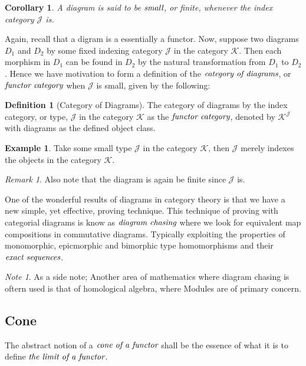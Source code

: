 \documentclass[10pt, oneside, reqno]{amsart}
\theoremstyle{plain}%
\newtheorem*{cor}{Corollary}
\theoremstyle{definition}
\newtheorem{defn}[thm]{Definition}
\newtheorem{exmp}[thm]{Example}
\theoremstyle{remark}
\newtheorem*{rem}{Remark}
\newtheorem*{note}{Note}
\begin{document}
\begin{cor}
 A diagram is said to be $\emph{small}$, or finite, whenever the index category $\mathcal{J}$ is.
\end{cor}

Again, recall that a digram is a essentially a functor.
Now, suppose two diagrams $D_{1}$ and $D_{2}$ by some fixed indexing category $\mathcal{J}$ in the category $\mathcal{K}$.
Then each morphism in $D_{1}$ can be found in $D_{2}$ by the natural transformation from $D_{1}$ to $D_{2}$.
Hence we have motivation to form a definition of the $\emph{category of diagrams}$, or $\emph{functor category}$ when
$\mathcal{J}$ is small, given by the following:

\begin{defn}[Category of Diagrams]
 The category of diagrams by the index category, or type, $\mathcal{J}$ in the category $\mathcal{K}$ as the $\emph{functor category}$,
 denoted by $\mathcal{K}^{\mathcal{J}}$ with diagrams as the defined object class.
\end{defn}

\begin{exmp}
 Take some small type $\mathcal{J}$ in the category $\mathcal{K}$,
 then $\mathcal{J}$ merely indexes the objects in the category $\mathcal{K}$.
 \begin{rem}
  Also note that the diagram is again be finite since $\mathcal{J}$ is.
 \end{rem}
\end{exmp}

One of the wonderful results of diagrams in category theory is that we have a new simple, yet effective, proving technique.
This technique of proving with categorial diagrams is know as $\emph{diagram chasing}$ where we look for equivalent map compositions in commutative diagrams.
Typically exploiting the properties of monomorphic, epicmorphic and bimorphic type homomorphisms and their $\emph{exact sequences}$.
\begin{note}
 As a side note;
 Another area of mathematics where diagram chasing is oftern used is that of homological algebra, where Modules are of primary concern.
\end{note}

\subsection{Cone} %
\label{subsec:cone}
The abstract notion of a $\emph{cone of a functor}$ shall be the essence of what it is to define $\emph{the limit of a functor}$.
\end{document}
